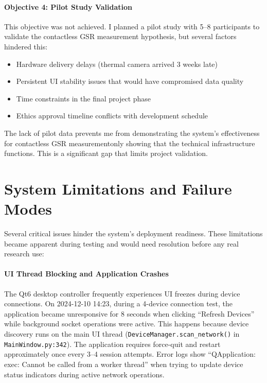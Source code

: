 \paragraph{\textbf{Objective 4: Pilot Study Validation}} This objective was not achieved. I planned a pilot study with 5--8 participants to validate the contactless GSR measurement hypothesis, but several factors hindered this:
\begin{itemize}
    \item Hardware delivery delays (thermal camera arrived 3 weeks late)
    \item Persistent UI stability issues that would have compromised data quality
    \item Time constraints in the final project phase
    \item Ethics approval timeline conflicts with development schedule
\end{itemize}
The lack of pilot data prevents me from demonstrating the system's effectiveness for contactless GSR measurement\textemdash only showing that the technical infrastructure functions. This is a significant gap that limits project validation.


\section{System Limitations and Failure Modes}

Several critical issues hinder the system's deployment readiness. These limitations became apparent during testing and would need resolution before any real research use:

\paragraph{\textbf{UI Thread Blocking and Application Crashes}} The Qt6 desktop controller frequently experiences UI freezes during device connections. On 2024-12-10 14:23, during a 4-device connection test, the application became unresponsive for 8 seconds when clicking ``Refresh Devices'' while background socket operations were active. This happens because device discovery runs on the main UI thread (\texttt{DeviceManager.scan\_network()} in \texttt{MainWindow.py:342}). The application requires force-quit and restart approximately once every 3--4 session attempts. Error logs show ``QApplication: exec: Cannot be called from a worker thread'' when trying to update device status indicators during active network operations.

